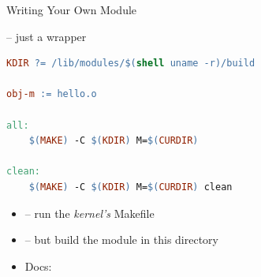 \begin{frame}[fragile]{Writing Your Own Module}{}

  \begin{block}{ -- just a wrapper}
    \begin{lstlisting}[language=make,basicstyle=\footnotesize\ttfamily]
KDIR ?= /lib/modules/$(shell uname -r)/build

obj-m := hello.o

all:
	$(MAKE) -C $(KDIR) M=$(CURDIR)

clean:
	$(MAKE) -C $(KDIR) M=$(CURDIR) clean
    \end{lstlisting}
  \end{block}

  \pause

  \begin{itemize}
    \item {} -- run the \emph{kernel's} Makefile
    \item {} -- but build the module in this directory
    \item Docs: 
  \end{itemize}

\end{frame}

